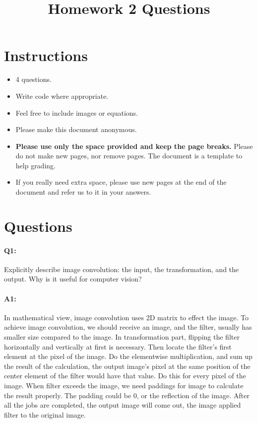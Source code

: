 \date{}

\title{\vspace{-1cm}Homework 2 Questions}



	\maketitle
	\vspace{-3cm}
	\thispagestyle{fancy}
	
	\section*{Instructions}
	\begin{itemize}
		\item 4 questions.
		\item Write code where appropriate.
		\item Feel free to include images or equations.
		\item Please make this document anonymous.
		\item \textbf{Please use only the space provided and keep the page breaks.} Please do not make new pages, nor remove pages. The document is a template to help grading.
		\item If you really need extra space, please use new pages at the end of the document and refer us to it in your answers.
	\end{itemize}

	\section*{Questions}
	
	\paragraph{Q1:} Explicitly describe image convolution: the input, the transformation, and the output. Why is it useful for computer vision?
	
	\paragraph{A1:} In mathematical view, image convolution uses 2D matrix to effect the image. To achieve image convolution, we should receive an image, and the filter, usually has smaller size compared to the image.
	In transformation part, flipping the filter horizontally and vertically at first is necessary. Then locate the filter's first element at the pixel of the image. Do the elementwise multiplication, and sum up the result of the calculation, the output image's pixel at the same position of the center element of the filter would have that value.
	Do this for every pixel of the image. When filter exceeds the image, we need paddings for image to calculate the result properly. The padding could be 0, or the reflection of the image.
	After all the jobs are completed, the output image will come out, the image applied filter to the original image.
	

